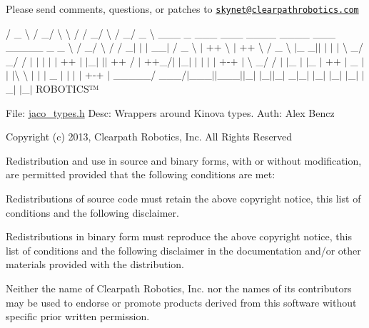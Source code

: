 Please send comments, questions, or patches to \href{mailto:skynet@clearpathrobotics.com}{\tt skynet@clearpathrobotics.\+com}



 / \+\_\+ \textbackslash{} / \+\_\+/ \textbackslash{} \textbackslash{} / / \+\_\+/ \textbackslash{} / \+\_\+/ \+\_\+ \textbackslash{} \+\_\+\+\_\+\+\_\+ \+\_\+ \+\_\+\+\_\+\+\_\+ \+\_\+\+\_\+\+\_\+ \+\_\+\+\_\+\+\_\+\+\_\+ \+\_\+\+\_\+\+\_\+\+\_\+ \+\_\+\+\_\+\+\_\+ \+\_\+\+\_\+\+\_\+\+\_\+\+\_\+ \+\_\+ \+\_\+ \textbackslash{} / \+\_\+/ \textbackslash{} / / \+\_\+$|$ $\vert$ $\vert$ \+\_\+\+\_\+$\vert$ / \+\_\+ \textbackslash{} $\vert$ ++ \textbackslash{} $\vert$ ++ \textbackslash{} / \+\_\+ \textbackslash{} $\vert$\+\_\+ \+\_\+$\vert$$\vert$ $\vert$ $\vert$ $\vert$ \textbackslash{} \+\_\+/ \+\_\+/ / $\vert$ $\vert$ $\vert$ $\vert$ $\vert$ ++ $\vert$ $\vert$\+\_\+$\vert$ $\vert$$\vert$ ++ / $\vert$ ++\+\_\+/$\vert$ $\vert$\+\_\+$\vert$ $\vert$ $\vert$ $\vert$ $\vert$ +-\/+ $\vert$ \textbackslash{} \+\_\+/ / $\vert$ $\vert$\+\_\+ $\vert$ $\vert$\+\_\+ $\vert$ ++ $\vert$ \+\_\+ $\vert$$\vert$ $\vert$\textbackslash{} \textbackslash{} $\vert$ $\vert$ $\vert$ \+\_\+ $\vert$ $\vert$ $\vert$ $\vert$ +-\/+ $\vert$ \+\_\+\+\_\+\+\_\+\+\_\+\+\_\+/ \+\_\+\+\_\+\+\_\+/$\vert$\+\_\+\+\_\+\+\_\+$\vert$$\vert$\+\_\+\+\_\+\+\_\+$\vert$$\vert$\+\_\+$\vert$ $\vert$\+\_\+$\vert$$\vert$\+\_\+$\vert$ \+\_\+$|$\+\_\+$\vert$ $\vert$\+\_\+$\vert$ $\vert$\+\_\+$\vert$ $\vert$\+\_\+$\vert$ $\vert$\+\_\+$\vert$ $\vert$\+\_\+$\vert$ R\+O\+B\+O\+T\+I\+C\+S™

File\+: \hyperlink{jaco__types_8h}{jaco\+\_\+types.\+h} Desc\+: Wrappers around Kinova types. Auth\+: Alex Bencz

Copyright (c) 2013, Clearpath Robotics, Inc. All Rights Reserved

Redistribution and use in source and binary forms, with or without modification, are permitted provided that the following conditions are met\+:
\begin{DoxyItemize}
\item Redistributions of source code must retain the above copyright notice, this list of conditions and the following disclaimer.
\item Redistributions in binary form must reproduce the above copyright notice, this list of conditions and the following disclaimer in the documentation and/or other materials provided with the distribution.
\item Neither the name of Clearpath Robotics, Inc. nor the names of its contributors may be used to endorse or promote products derived from this software without specific prior written permission.
\end{DoxyItemize}

